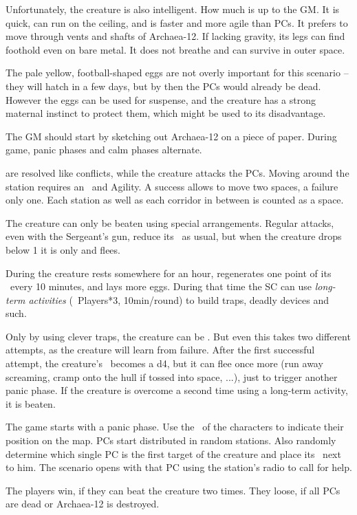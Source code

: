 {		Unfortunately, the creature is also intelligent. How much is up to the GM. It is quick, can run on the ceiling, and is faster and more agile than PCs. It prefers to move through vents and shafts of Archaea-12. If lacking gravity, its legs can find foothold even on bare metal. It does not breathe and can survive in outer space.

		The pale yellow, football-shaped eggs are not overly important for this scenario -- they will hatch in a few days, but by then the PCs would already be dead. However the eggs can be used for suspense, and the creature has a strong maternal instinct to protect them, which might be used to its disadvantage.


		\noindent
		The GM should start by sketching out Archaea-12 on a piece of paper. During game, panic phases and calm phases alternate.

		 are resolved like conflicts, while the creature attacks the PCs. Moving around the station requires an \AD~and Agility. A success allows to move two spaces, a failure only one. Each station as well as each corridor in between is counted as a space.

		The creature can only be beaten using special arrangements. Regular attacks, even with the Sergeant's gun, reduce its \HD\ as usual, but when the creature drops below 1 it is only  and flees.

		During  the creature rests somewhere for an hour, regenerates one point of its \HD\ every 10 minutes, and lays more eggs. During that time the SC can use \emph{long-term activities} (\TN~Players*3, 10min/round) to build traps, deadly devices and such.

		Only by using clever traps, the creature can be . But even this takes two different attempts, as the creature will learn from failure. After the first successful attempt, the creature's \HD~becomes a d4, but it can flee once more (run away screaming, cramp onto the hull if tossed into space, ...), just to trigger another panic phase. If the creature is overcome a second time using a long-term activity, it is beaten.

		The game starts with a panic phase. Use the \HD\ of the characters to indicate their position on the map. PCs start distributed in random stations. Also randomly determine which single PC is the first target of the creature and place its \HD\ next to him. The scenario opens with that PC using the station's radio to call for help.


		\noindent
		The players win, if they can beat the creature two times. They loose, if all PCs are dead or Archaea-12 is destroyed.

}
